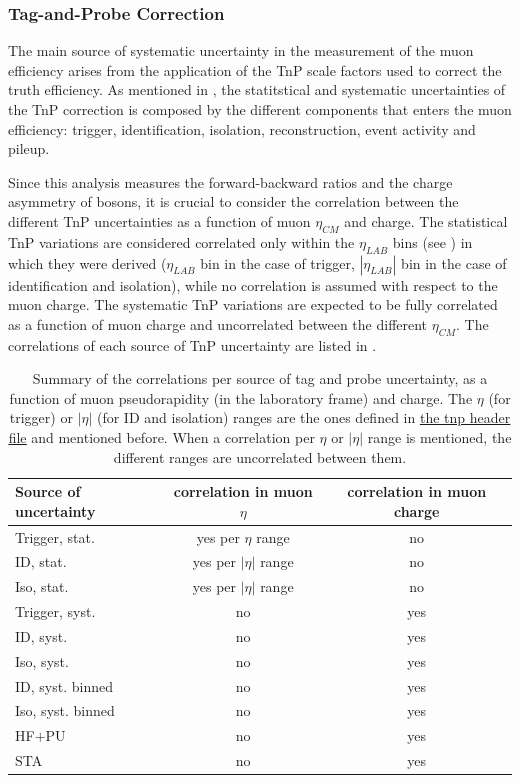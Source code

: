 \clearpage
\subsubsection{Tag-and-Probe Correction}

The main source of systematic uncertainty in the measurement of the muon efficiency arises from the application of the TnP scale factors used to correct the truth efficiency. As mentioned in , the statitstical and systematic uncertainties of the TnP correction is composed by the different components that enters the muon efficiency: trigger, identification, isolation, reconstruction, event activity and pileup.

Since this analysis measures the forward-backward ratios and the charge asymmetry of \W bosons, it is crucial to consider the correlation between the different TnP uncertainties as a function of muon $\eta_{CM}$ and charge. The statistical TnP variations are considered correlated only within the $\eta_{LAB}$ bins (see \cite{Muon_TnP_pPb}) in which they were derived ($\eta_{LAB}$ bin in the case of trigger, $|\eta_{LAB}|$ bin in the case of identification and isolation), while no correlation is assumed with respect to the muon charge. The systematic TnP variations are expected to be fully correlated as a function of muon charge and uncorrelated between the different $\eta_{CM}$. The correlations of each source of TnP uncertainty are listed in .

\begin{table}[!htb]
 \caption{Summary of the correlations per source of tag and probe uncertainty, as a function of muon pseudorapidity (in the laboratory frame) and charge. The $\eta$ (for trigger) or $|\eta|$ (for ID and isolation) ranges are the ones defined in \href{https://github.com/CMS-HIN-dilepton/MuonAnalysis-TagAndProbe/blob/80X_HI/macros/tnp_weight.h}{\underline{the tnp header file}} and mentioned before. When a correlation per $\eta$ or $|\eta|$ range is mentioned, the different ranges are uncorrelated between them.
 \label{tab:systcorr}}
 
 \begin{center}
 \begin{tabular}{l|c|c}
 \hline
 Source of uncertainty & correlation in muon $\eta$ & correlation in muon charge \\
 \hline
 Trigger, stat. & yes per $\eta$ range & no \\
 ID, stat. & yes per $|\eta|$ range & no \\
 Iso, stat. & yes per $|\eta|$ range & no \\
 Trigger, syst. & no & yes \\
 ID, syst. & no & yes \\
 Iso, syst. & no & yes \\
 ID, syst. binned & no & yes \\
 Iso, syst. binned & no & yes \\
 HF$+$PU & no & yes \\
 STA & no & yes \\
 \hline
 \end{tabular}
 \end{center}
\end{table}

